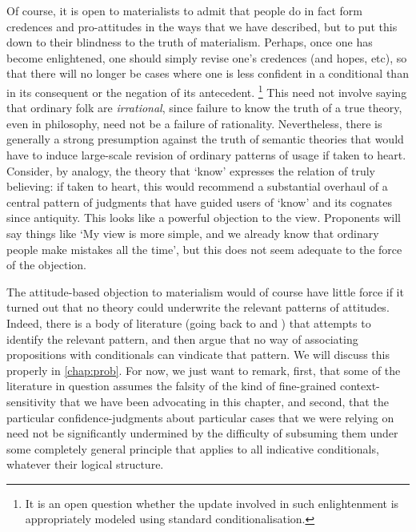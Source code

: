 \documentclass[If.tex]{subfiles}
\begin{document}
Of course, it is open to materialists to admit that people do in fact form credences and pro-attitudes in the ways that we have described, but to put this down to their blindness to the truth of materialism.  Perhaps, once one has become enlightened, one should simply revise one's credences (and hopes, etc), so that there will no longer be cases where one is less confident in a conditional than in its consequent or the negation of its antecedent.%
\footnote{It is an open question whether the update involved in such enlightenment is appropriately modeled using standard conditionalisation.}  
This need not involve saying that ordinary folk are \emph{irrational}, since failure to know the truth of a true theory, even in philosophy, need not be a failure of rationality.  Nevertheless, there is generally a strong presumption against the truth of semantic theories that would have to induce large-scale revision of ordinary patterns of usage if taken to heart.  Consider, by analogy, the theory that ‘know’ expresses the relation of truly believing: if taken to heart, this would recommend a substantial overhaul of a central pattern of judgments that have guided users of ‘know’ and its cognates since antiquity.  This looks like a powerful objection to the view.  Proponents will say things like ‘My view is more simple, and we already know that ordinary people make mistakes all the time’, but this does not seem adequate to the force of the objection.

The attitude-based objection to materialism would of course have little force if it turned out that no theory could underwrite the relevant patterns of attitudes. Indeed, there is a body of literature (going back to \cite{LewisPCCP} and \cite{StalnakerLVF}) that attempts to identify the relevant pattern, and then argue that no way of associating propositions with conditionals can vindicate that pattern.  We will discuss this properly in \autoref{chap:prob}.  For now, we just want to remark, first, that some of the literature in question assumes the falsity of the kind of fine-grained context-sensitivity that we have been advocating in this chapter, and second, that the particular confidence-judgments about particular cases that we were relying on need not be significantly undermined by the difficulty of subsuming them under some completely general principle that applies to all indicative conditionals, whatever their logical structure.


\end{document}
